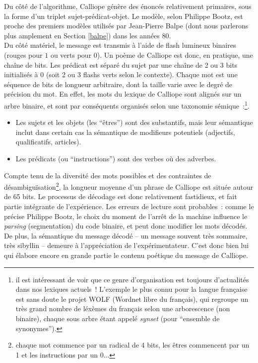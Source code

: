 \documentclass{article}
\begin{document}
					Du côté de l'algorithme, Calliope génère des énoncés relativement primaires, sous la forme d'un triplet sujet-prédicat-objet. Le modèle, selon Philippe Bootz, est proche des premiers modèles utilisés par Jean-Pierre Balpe (dont nous parlerons plus amplement en Section \ref{balpe}) dans les années 80.\\
					Du côté matériel, le message est transmis à l'aide de flash lumineux binaires (rouges pour $1$ ou verts pour $0$). Un poème de Calliope est donc, en pratique, une chaîne de bits. Les prédicat est séparé du sujet par une chaîne de 2 ou 3 bits initialisés à 0 (soit 2 ou 3 flashs verts selon le contexte). Chaque mot est une séquence de bits de longueur arbitraire, dont la taille varie avec le degré de précision du mot. En effet, les mots du lexique de Calliope sont alignés sur un arbre binaire, et sont par conséquents organisés selon une taxonomie sémique~:\footnote{il est intéressant de voir que ce genre d'organisation est toujours d'actualités dans nos lexiques actuels ! L'exemple le plus connu pour la langue française est sans doute le projet WOLF (Wordnet libre du français), qui regroupe un très grand nombre de léxèmes du français selon une arborescence (non binaire), chaque sous arbre étant appelé \textit{synset} (pour ``ensemble de synonymes'').}.
					\begin{itemize}
						\item Les sujets et les objets (les ``êtres'') sont des substantifs, mais leur sémantique inclut dans certain cas la sémantique de modifieurs potentiels (adjectifs, qualificatifs, articles).
						\item Les prédicats (ou ``instructions'') sont des verbes où des adverbes.
					\end{itemize} 
					Compte tenu de la diversité des mots possibles et des contraintes de désambiguïsation\footnote{chaque mot commence par un radical de 4 bits, les êtres commencent par un 1 et les instructions par un 0...}, la longueur moyenne d'un phrase de Calliope est située autour de 65 bits. Le processus de décodage est donc relativement fastidieux, et fait partie intégrante de l'expérience. Les erreurs de lecture sont probables~: comme le précise Philippe Bootz, le choix du moment de l'arrêt de la machine influence le \textit{parsing} (segmentation) du code binaire, et peut donc modifier les mots décodés. De plus, la sémantique du message décodé -- un message souvent très sommaire, très sibyllin -- demeure à l'appréciation de l'expérimentateur. C'est donc bien lui qui élabore encore en grande partie le contenu poétique du message de Calliope.
\end{document}
